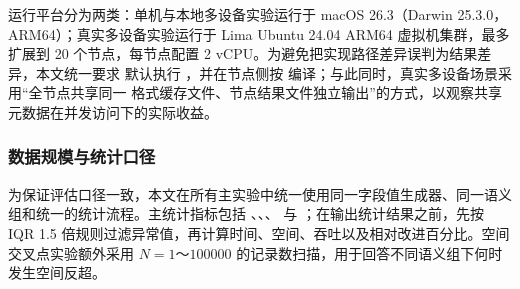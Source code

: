 运行平台分为两类：单机与本地多设备实验运行于 macOS 26.3（Darwin 25.3.0，ARM64）；真实多设备实验运行于 Lima Ubuntu 24.04 ARM64 虚拟机集群，最多扩展到 20 个节点，每节点配置 2 vCPU。为避免把实现路径差异误判为结果差异，本文统一要求  默认执行 ，并在节点侧按  编译；与此同时，真实多设备场景采用``全节点共享同一  格式缓存文件、节点结果文件独立输出''的方式，以观察共享元数据在并发访问下的实际收益。

\subsubsection{数据规模与统计口径}\label{ux6570ux636eux89c4ux6a21ux4e0eux7edfux8ba1ux53e3ux5f84}

为保证评估口径一致，本文在所有主实验中统一使用同一字段值生成器、同一语义组和统一的统计流程。主统计指标包括 、、、 与 ；在输出统计结果之前，先按 IQR 1.5 倍规则过滤异常值，再计算时间、空间、吞吐以及相对改进百分比。空间交叉点实验额外采用 \(N=1\text{～}100000\) 的记录数扫描，用于回答不同语义组下何时发生空间反超。


